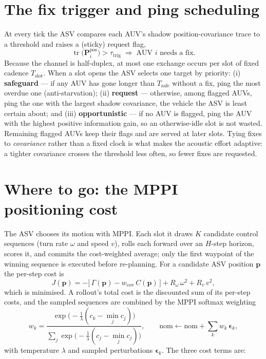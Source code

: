 \documentclass[12pt,a4paper,oneside]{book}
\begin{document}
\section{The fix trigger and ping scheduling}
\label{sec:trigger}
At every tick the ASV compares each AUV's shadow position-covariance trace to a threshold and raises a
(sticky) request flag,
\begin{equation}
\operatorname{tr}\!\big(\mathbf{P}^{\text{pos}}_{i}\big) > \tau_{\text{trig}}
\;\Rightarrow\; \text{AUV $i$ needs a fix.}
\label{eq:trig}
\end{equation}
Because the channel is half-duplex, at most one exchange occurs per slot of fixed cadence
$T_{\text{slot}}$. When a slot opens the ASV selects one target by priority: (i) \textbf{safeguard} --- if
any AUV has gone longer than $T_{\text{safe}}$ without a fix, ping the most overdue one (anti-starvation);
(ii) \textbf{request} --- otherwise, among flagged AUVs, ping the one with the largest shadow covariance,
the vehicle the ASV is least certain about; and (iii) \textbf{opportunistic} --- if no AUV is flagged, ping
the AUV with the highest positive information gain, so an otherwise-idle slot is not wasted. Remaining
flagged AUVs keep their flags and are served at later slots. Tying fixes to \emph{covariance} rather than a fixed clock is what makes the acoustic
effort adaptive: a tighter covariance crosses the threshold less often, so fewer fixes are requested.

\section{Where to go: the MPPI positioning cost}
\label{sec:mppi}
The ASV chooses its motion with MPPI. Each slot it draws $K$ candidate control sequences (turn rate $\omega$
and speed $v$), rolls each forward over an $H$-step horizon, scores it, and commits the cost-weighted
average; only the first waypoint of the winning sequence is executed before re-planning. For a candidate ASV
position $\mathbf{p}$ the per-step cost is
\begin{equation}
J(\mathbf{p}) = -\Big[\,\Gamma(\mathbf{p}) - w_{\text{cov}}\,C(\mathbf{p})\,\Big]
      + R_{\omega}\,\omega^{2} + R_{v}\,v^{2},
\label{eq:cost}
\end{equation}
which is minimised. A rollout's total cost is the discounted sum of its per-step costs, and the sampled
sequences are combined by the MPPI softmax weighting
\begin{equation}
w_k = \frac{\exp\!\big(-\tfrac{1}{\lambda}(c_k-\min_j c_j)\big)}{\sum_{j}\exp\!\big(-\tfrac{1}{\lambda}(c_j-\min_j c_j)\big)},
\qquad
\text{nom}\leftarrow \text{nom} + \textstyle\sum_k w_k\,\boldsymbol{\epsilon}_k,
\label{eq:mppiw}
\end{equation}
with temperature $\lambda$ and sampled perturbations $\boldsymbol{\epsilon}_k$. The three cost terms are:
\end{document}
